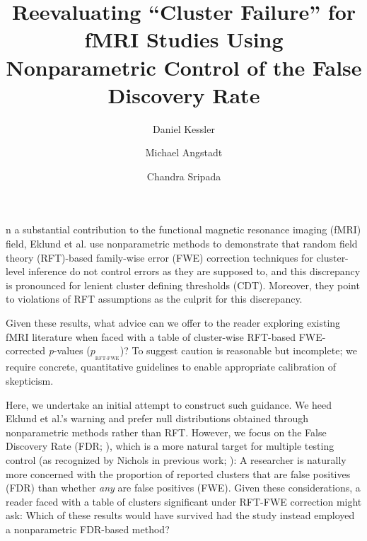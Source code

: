 \documentclass[9pt,twocolumn,twoside]{pnas-new}
\title{Reevaluating ``Cluster Failure'' for fMRI Studies Using Nonparametric Control of the False Discovery Rate}
\author[a,1,2]{Daniel Kessler}
\author[a,1]{Michael Angstadt}
\author[a,1]{Chandra Sripada}
\affil[a]{Department of Psychiatry, University of Michigan, Ann Arbor}
\newcommand{\subtext}[2]{
#1_{_{\text{#2}}}
}
\begin{document}
\verticaladjustment{-2pt}

\maketitle
\thispagestyle{firststyle}





n a substantial contribution to the functional magnetic resonance imaging (fMRI) field, Eklund et al. \cite{eklund_cluster_2016} use nonparametric methods to demonstrate that random field theory (RFT)-based family-wise error (FWE) correction techniques for cluster-level inference do not control errors as they are supposed to, and this discrepancy is pronounced for lenient cluster defining thresholds (CDT). 
Moreover, they point to violations of RFT assumptions as the culprit for this discrepancy.

Given these results, what advice can we offer to the reader exploring existing fMRI literature when faced with a table of cluster-wise RFT-based FWE-corrected \textit{p}-values ($\subtext{p}{RFT-FWE}$)? 
To suggest caution is reasonable but incomplete; we require concrete, quantitative guidelines to enable appropriate calibration of skepticism.

Here, we undertake an initial attempt to construct such guidance.
We heed Eklund et al.'s warning and prefer null distributions obtained through nonparametric methods rather than RFT.
However, we focus on the False Discovery Rate (FDR; \cite{benjamini_controlling_1995}), which is a more natural target for multiple testing control (as recognized by Nichols in previous work; \cite{genovese_thresholding_2002}):
A researcher is naturally more concerned with the proportion of reported clusters that are false positives (FDR) than whether \textit{any} are false positives (FWE).
Given these considerations, a reader faced with a table of clusters significant under RFT-FWE correction might ask: Which of these results would have survived had the study instead employed a nonparametric FDR-based method?
\end{document}

